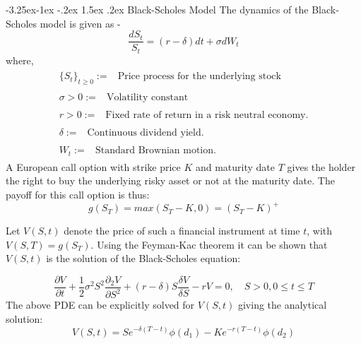 \documentclass[11pt]{article}
\makeatletter
\renewcommand\subsection{\@startsection{subsection}{2}{\z@}%
                                         {-3.25ex\@plus -1ex \@minus -.2ex}%
                                         {1.5ex \@plus .2ex}%
                                         {\normalfont\fontfamily{phv}\fontsize{14}{17}\bfseries}}
\makeatother
\begin{document}
\subsection{Black-Scholes Model}
The dynamics of the Black-Scholes model is given as - 
\begin{equation*}
    \frac{dS_{t}}{S_{t}} = (r-\delta)dt + \sigma dW_{t}
\end{equation*}
where,
\begin{align*}
    \begin{split}
    \{S_{t}\}_{t\ge 0} :={}& \mbox{Price process for the underlying stock}
    \end{split}\\
    \begin{split}
    \sigma>0 :={}& \mbox{Volatility constant}
    \end{split}\\
    \begin{split}
    r>0 :={}& \mbox{Fixed rate of return in a risk neutral economy.}
    \end{split}\\
    \begin{split}
    \delta :={}& \mbox{Continuous dividend yield.}
    \end{split}\\
    \begin{split}
    W_{t}:={}& \mbox{Standard Brownian motion.}
    \end{split}
\end{align*}
A European call option with strike price $K$ and maturity date $T$ gives the holder the right to buy the underlying risky asset or not at the maturity date. The payoff for this call option is thus:
\begin{equation*}
    g(S_{T}) = max(S_{T}-K, 0) = (S_{T}-K)^{+}
\end{equation*}

Let $V(S,t)$ denote the price of such a financial instrument at time $t$, with $V(S,T) = g(S_{T})$. Using the Feyman-Kac theorem it can be shown that $V(S,t)$ is the solution of the Black-Scholes equation:

\begin{equation}
    \frac{\partial V}{\partial t}+\frac{1}{2}\sigma^{2}S^{2}\frac{\partial_{2}V}{\partial S^{2}} + (r-\delta)S\frac{\delta V}{\delta S} -rV = 0, \quad S>0, 0\le t \le T
\end{equation}
The above PDE can be explicitly solved for $V(S,t)$ giving the analytical solution:
\begin{equation*}
    V(S,t) = Se^{-\delta(T-t)}\phi(d_{1})-Ke^{-r(T-t)}\phi(d_{2})
\end{equation*}
\end{document}
